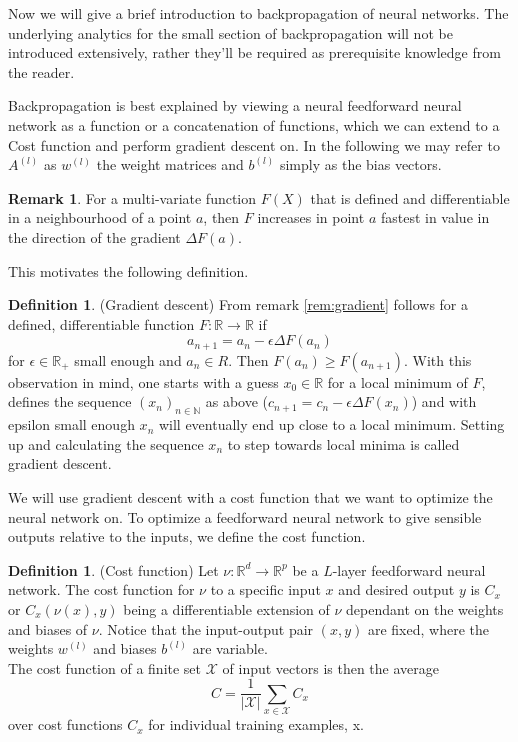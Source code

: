 \documentclass{article}
\theoremstyle{definition}
\newtheorem{definition}[theorem]{Definition}
\newtheorem{remark}[theorem]{Remark}
\begin{document}
Now we will give a brief introduction to backpropagation of neural networks. The underlying analytics for the small section of backpropagation will not be introduced extensively, rather they'll be required as prerequisite knowledge from the reader.

Backpropagation is best explained by viewing a neural feedforward neural network as a function or a concatenation of functions, which we can extend to a Cost function and perform gradient descent on.
In the following we may refer to $A^{(l)}$ as $w^{(l)}$ the weight matrices and $b^{(l)}$ simply as the bias vectors.

\begin{remark}
For a multi-variate function $F(X)$ that is defined and differentiable in a neighbourhood of a point $a$, then $F$ increases in point $a$ fastest in value in the direction of the gradient $\Delta F(a)$.
\end{remark}\label{rem:gradient}
This motivates the following definition.

\begin{definition}(Gradient descent)
From remark \ref{rem:gradient} follows for a defined, differentiable function $F: \mathbb{R} \to \mathbb{R}$ if 
$$a_{n+1}=a_{n}-\epsilon \Delta F(a_{n})$$
for $\epsilon \in \mathbb{R}_{+}$ small enough and $a_{n} \in R$. Then $F(a_{n}) \geq F(a_{n+1})$. With this observation in mind, one starts with a guess $x_{0} \in \mathbb{R}$ for a local minimum of $F$, defines the sequence $(x_{n})_{n\in\mathbb{N}}$ as above ($c_{n+1}=c_{n}-\epsilon \Delta F(x_{n})$) and with epsilon small enough $x_{n}$ will eventually end up close to a local minimum. Setting up and calculating the sequence $x_{n}$ to step towards local minima is called gradient descent.
\end{definition}

We will use gradient descent with a cost function that we want to optimize the neural network on. To optimize a feedforward neural network to give sensible outputs relative to the inputs, we define the cost function.

\begin{definition}(Cost function)
\label{def:cost_fct}
Let $\nu : \mathbb{R}^{d} \to \mathbb{R}^{p}$ be a $L$-layer feedforward neural network. The cost function for $\nu$ to a specific input $x$ and desired output $y$ is $C_{x}$ or $C_{x}(\nu(x), y)$ being a differentiable extension of $\nu$ dependant on the weights and biases of $\nu$. Notice that the input-output pair $(x, y)$ are fixed, where the weights $w^{(l)}$ and biases $b^{(l)}$ are variable. \\
The cost function of a finite set $\mathcal{X}$ of input vectors is then the average $$C=\frac{1}{|\mathcal{X}|}\sum_{x \in \mathcal{X}}C_{x}$$
over cost functions $C_{x}$ for individual training examples, x.
\end{definition}
\end{document}
